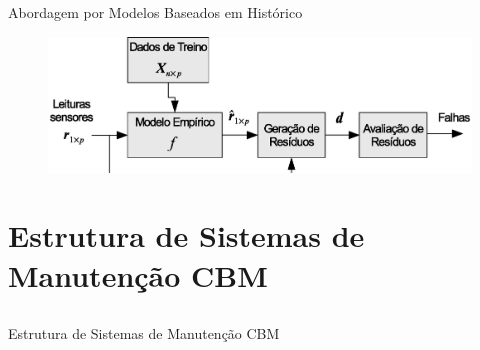 \documentclass{beamer}
\begin{document}
\begin{frame}{Abordagem por Modelos Baseados em Histórico}
    
    \begin{figure}[!htb]
        \centering\hspace*{-20pt}
        \includegraphics[width=1.1\textwidth]{figuras/data_driven_fdd.eps}
    \end{figure}

\end{frame}

\section{Estrutura de Sistemas de Manutenção CBM}
\subsection{}

\begin{frame}{Estrutura de Sistemas de Manutenção CBM}
    
\end{frame}
\end{document}
